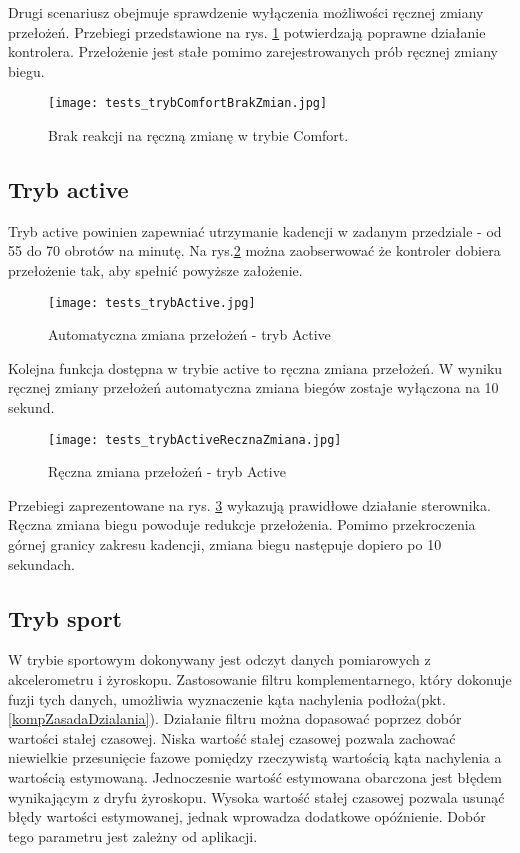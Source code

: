 Drugi scenariusz obejmuje sprawdzenie wyłączenia możliwości ręcznej zmiany przełożeń. Przebiegi przedstawione na rys. \ref{fig:tests_noChange} potwierdzają poprawne działanie kontrolera. Przełożenie jest stałe pomimo zarejestrowanych prób ręcznej zmiany biegu.
\begin{figure}[h]
    \centering
    \texttt{[image: tests\_trybComfortBrakZmian.jpg]}
    \caption{Brak reakcji na ręczną zmianę w trybie Comfort.}
    \label{fig:tests_noChange}
\end{figure}

\subsection{Tryb active}

Tryb active powinien zapewniać utrzymanie kadencji w zadanym przedziale - od 55 do 70 obrotów na minutę. Na rys.\ref{fig:tests_active} można zaobserwować że kontroler dobiera  przełożenie tak, aby spełnić powyższe założenie.
\begin{figure}[h]
    \centering
    \texttt{[image: tests\_trybActive.jpg]}
    \caption{Automatyczna zmiana przełożeń - tryb Active}
    \label{fig:tests_active}
\end{figure}

Kolejna funkcja dostępna w trybie active to ręczna zmiana przełożeń. W wyniku ręcznej zmiany przełożeń automatyczna zmiana biegów zostaje wyłączona na 10 sekund. 
\begin{figure}[h]
    \centering
    \texttt{[image: tests\_trybActiveRecznaZmiana.jpg]}
    \caption{Ręczna zmiana przełożeń - tryb Active}
    \label{fig:tests_activeReczna}
\end{figure}

Przebiegi zaprezentowane na rys. \ref{fig:tests_activeReczna} wykazują prawidłowe działanie sterownika. Ręczna zmiana biegu powoduje redukcje przełożenia. Pomimo przekroczenia górnej granicy zakresu kadencji, zmiana biegu następuje dopiero po 10 sekundach.

\subsection{Tryb sport}
W trybie sportowym dokonywany jest odczyt danych pomiarowych z akcelerometru i żyroskopu. Zastosowanie filtru komplementarnego, który dokonuje fuzji tych danych, umożliwia wyznaczenie kąta nachylenia podłoża(pkt.\ref{kompZasadaDzialania}). Działanie filtru można dopasować poprzez dobór wartości stałej czasowej. Niska wartość stałej czasowej pozwala zachować niewielkie przesunięcie fazowe pomiędzy rzeczywistą wartością kąta nachylenia a wartością estymowaną. Jednoczesnie wartość estymowana obarczona jest błędem wynikającym z dryfu żyroskopu. Wysoka wartość stałej czasowej pozwala usunąć błędy wartości estymowanej, jednak wprowadza dodatkowe opóźnienie. Dobór tego parametru jest zależny od aplikacji.

